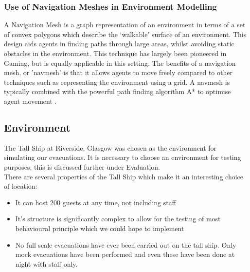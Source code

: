 \documentclass{article}
\begin{document}
\subsubsection{Use of Navigation Meshes in Environment Modelling}
A Navigation Mesh is a graph representation of an environment in terms of a set of convex polygons which describe the `walkable' surface of an environment. This design aids agents in finding paths through large areas, whilst avoiding static obstacles in the environment.
This technique has largely been pioneered in Gaming, but is equally applicable in this setting. The benefits of a navigation mesh, or 'navmesh' is that it allows agents to move 
freely compared to other techniques such as representing the environment using a grid. A navmesh is typically combined with the powerful path finding algorithm A* to 
optimise agent movement \cite{A*Review}.

\subsection{Environment}
The Tall Ship at Riverside, Glasgow \cite{TallShipWebsite} was chosen as the environment for simulating our evacuations. It is necessary to choose an environment for testing purposes; this
is discussed further under Evaluation.\\
There are several properties of the Tall Ship which make it an interesting choice of location:
\begin{itemize}
\item{It can host 200 guests at any time, not including staff}
\item{It's structure is significantly complex to allow for the testing of most behavioural principle which we could hope to implement}
\item{No full scale evacuations have ever been carried out on the tall ship. Only mock evacuations have been performed and even these have been done at night with staff only.}
\end{itemize}
\end{document}
